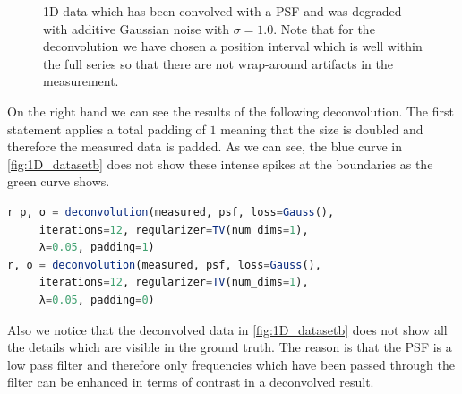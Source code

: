 \documentclass{juliacon}
\begin{document}
\begin{figure}[H]
\begin{subfigure}[b]{.25\textwidth}
                \caption{}
                \label{fig:1D_datasetb}
            \end{subfigure}
            \caption{1D data which has been convolved with a PSF and was degraded with additive Gaussian noise with $\sigma=1.0$. Note that for the deconvolution we have chosen a position interval which is well within the full series so that there are not wrap-around artifacts in the measurement.}
            \label{fig:1D_dataset}
        \end{figure}
        On the right hand we can see the results of the following deconvolution.
    The first statement applies a total padding of $1$ meaning that the size is doubled and therefore the measured data is padded.
    As we can see, the blue curve in \autoref{fig:1D_datasetb} does not show these intense spikes at the boundaries as the green curve shows.
        \begin{lstlisting}[language=Julia]
r_p, o = deconvolution(measured, psf, loss=Gauss(),
     iterations=12, regularizer=TV(num_dims=1),
     λ=0.05, padding=1)
r, o = deconvolution(measured, psf, loss=Gauss(), 
     iterations=12, regularizer=TV(num_dims=1),
     λ=0.05, padding=0)
        \end{lstlisting}
    Also we notice that the deconvolved data in \autoref{fig:1D_datasetb} does not show all the details which are visible in the ground truth.
    The reason is that the PSF is a low pass filter and therefore only frequencies which have been passed through the filter 
    can be enhanced in terms of contrast in a deconvolved result.
\end{document}
